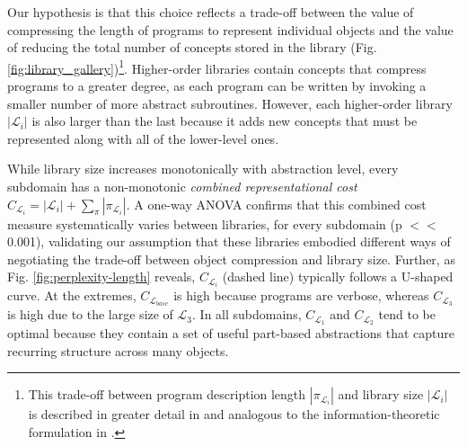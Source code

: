 \documentclass[10pt,letterpaper]{article}
\begin{document}
Our hypothesis is that this choice reflects a trade-off between the value of compressing the length of programs to represent individual objects and the value of reducing the total number of concepts stored in the library (Fig. \ref{fig:library_gallery})\footnote{This trade-off between program description length $|\pi_{\mathcal{L}_i}|$ and library size $|\mathcal{L}_i|$ is described in greater detail in  and analogous to the information-theoretic formulation in .}.
Higher-order libraries contain concepts that compress programs to a greater degree, as each program can be written by invoking a smaller number of more abstract subroutines.
However, each higher-order library $|\mathcal{L}_i|$ is also larger than the last because it adds new concepts that must be represented along with all of the lower-level ones.




While library size increases monotonically with abstraction level, every subdomain has a non-monotonic \textit{combined representational cost} $C_{\mathcal{L}_i} = |\mathcal{L}_i| + \sum_{\pi} |\pi_{\mathcal{L}_i}|$. 
A one-way ANOVA confirms that this combined cost measure systematically varies between libraries, for every subdomain  (p $<<$ 0.001), validating our assumption that these libraries embodied different ways of negotiating the trade-off between object compression and library size. 
Further, as Fig. \ref{fig:perplexity-length} reveals, $C_{\mathcal{L}_i}$ (dashed line) typically follows a U-shaped curve. 
At the extremes, $C_{\mathcal{L}_{base}}$ is high because programs are verbose, whereas $C_{\mathcal{L}_3}$ is high due to the large size of ${\mathcal{L}_3}$. In all subdomains, $C_{\mathcal{L}_1}$ and $C_{\mathcal{L}_2}$ tend to be optimal because they contain a set of useful part-based abstractions that capture recurring structure across many objects. 
\end{document}
